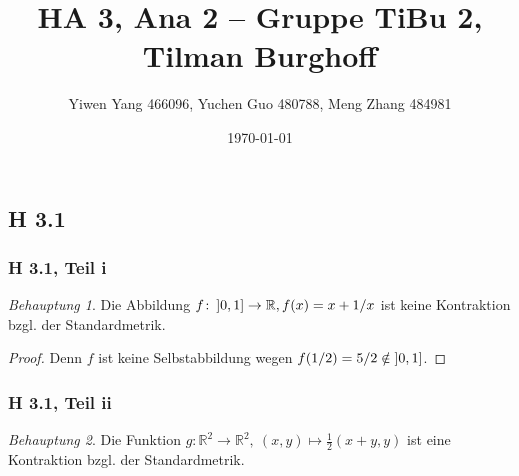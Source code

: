 \documentclass[draft,a5paper]{article}
\author{Yiwen Yang 466096, Yuchen Guo 480788, Meng Zhang 484981}
\date{\today}
\title{HA 3, Ana 2 -- Gruppe TiBu 2, Tilman Burghoff}
\theoremstyle{remark}
\newtheorem*{beh}{Behauptung}
\newcommand{\interval}[1]{\mathinner{#1}}
\begin{document}
\maketitle

\newpage

\subsection*{H 3.1}

\subsubsection*{H 3.1, Teil i}

\begin{beh}
  Die Abbildung \(f\colon \interval{]0, 1]} \to \mathbb{R}, f(x) = x + 1/x\) ist keine
  Kontraktion bzgl. der Standardmetrik.
\end{beh}

\begin{proof}
  Denn \(f\) ist keine Selbstabbildung wegen \(f(1/2) = 5/2 \notin \interval{]0,
  1]}\).
\end{proof}

\subsubsection*{H 3.1, Teil ii}

\begin{beh}
  Die Funktion \(g\colon \mathbb{R}^{2} \to \mathbb{R}^{2},~ (x, y) \mapsto \frac{1}{2}(x+y, y)\) ist
  eine Kontraktion bzgl. der Standardmetrik.
\end{beh}
\end{document}
